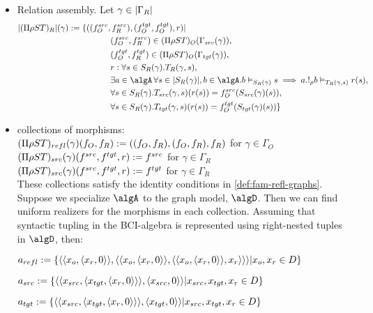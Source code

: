 \documentclass[12pt,a4paper]{article}
\def\src{_{src}}\alwaysmath{src}
\def\rfl{_{refl}}\alwaysmath{rfl}
\def\tgt{_{tgt}}\alwaysmath{tgt}
\renewcommand{\O}{_{O}}\alwaysmath{O}
\def\R{_{R}}\alwaysmath{R}
\begin{document}
\begin{itemize}[noitemsep]
   \item Relation assembly. Let $\gamma \in \carr{\Gamma\R}$
     \begin{align*}
       |(\Pi \rho S T)\R|(\gamma) \define \{( (f\O^{src},& \, f\R^{src}), (f\O^{tgt}, f\O^{tgt}), r)  | \\
       & (f\O^{src},f\R^{src}) \in (\Pi\rho S T)\O(\Gamma\src(\gamma)),\\
       & (f\O^{tgt},f\R^{tgt}) \in (\Pi\rho S T)\O(\Gamma\tgt(\gamma)),\\
       & r : \forall s \in S\R(\gamma). T\R(\gamma, s),\\
       & \exists a \in \algA\, \forall s \in \carr{S\R(\gamma)}, b \in \algA. b \vDash_{S\R(\gamma)} s \implies a . !_\rho b \vDash_{T\R(\gamma,s)} r(s),\\       
       & \forall s \in S\R(\gamma). T\src(\gamma, s)( r (s)) = f\O^{src}(S\src(\gamma)(s)),\\
       & \forall s \in S\R(\gamma). T\tgt(\gamma, s)( r (s)) = f\O^{tgt}(S\tgt(\gamma)(s)) \}
     \end{align*}
   \item collections of morphisms:\\
   $(\Pi \rho S T)\rfl(\gamma)(f\O, f\R) \define ((f\O, f\R), (f\O, f\R), f\R)$ for $\gamma \in \Gamma\O$\\
   $(\Pi \rho S T)\src(\gamma)(f^{src}, f^{tgt}, r) \define f^{src}$ for $\gamma \in \Gamma\R$ \\
   $(\Pi \rho S T)\src(\gamma)(f^{src}, f^{tgt}, r) \define f^{tgt}$ for $\gamma \in \Gamma\R$ \\
   These collections satisfy the identity conditions in \cref{def:fam-refl-graphs}.\\
   Suppose we specialize $\algA$ to the graph model, $\algD$. Then we can find uniform realizers for the morphisms in each collection. Assuming that syntactic tupling in the BCI-algebra is represented using right-nested tuples in $\algD$, then:
   
   \subitem $a\rfl \define \{ \langle \langle x_o, \langle x_r, 0 \rangle \rangle,  \langle \langle x_o, \langle x_r, 0 \rangle \rangle,  \langle \langle x_o, \langle x_r, 0 \rangle \rangle, x_r \rangle \rangle \rangle | x_o, x_r \in D \}$
   
   \subitem $a\src \define \{ \langle \langle x\src,  \langle x\tgt, \langle x_r , 0 \rangle \rangle \rangle  , \langle x\src , 0 \rangle \rangle  | x\src, x\tgt, x_r \in D\}$
   
   
   \subitem $a\tgt \define \{ \langle \langle x\src,  \langle x\tgt, \langle x_r , 0 \rangle \rangle \rangle  , \langle x\tgt , 0 \rangle \rangle  | x\src, x\tgt, x_r \in D\}$
   
\end{itemize}
\end{document}
